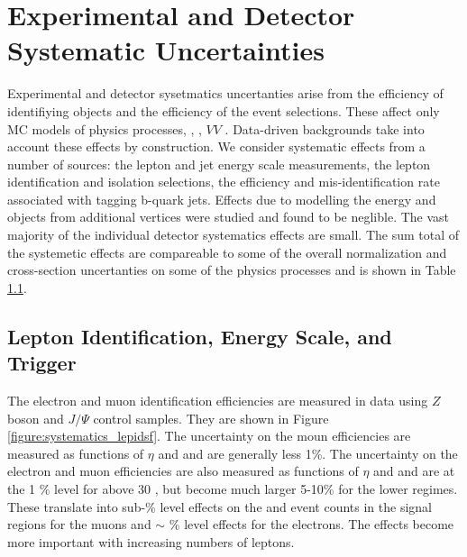 \section{Experimental and Detector Systematic Uncertainties}

Experimental and detector sysetmatics uncertanties arise from the efficiency of identifiying objects and the efficiency of the event selections. These affect only MC models of physics processes, \ttV, \tth, $VV$ . Data-driven backgrounds take into account these effects by construction. We consider systematic effects from a number of sources: the lepton and jet energy scale measurements, the lepton identification and isolation selections, the efficiency and mis-identification rate associated with tagging b-quark jets. Effects due to modelling the energy and objects from additional vertices were studied and found to be neglible. The vast majority of the individual detector systematics effects are small. The sum total of the systemetic effects are compareable to some of the overall normalization and cross-section uncertanties on some of the physics processes and is shown in Table \ref{}.

\subsection{Lepton Identification, Energy Scale, and Trigger}
The electron\cite{ATLAS-CONF-2014-032} and muon identification efficiencies\cite{MuonSF} are measured in data using $Z$ boson and $J/\Psi$ control samples. They are shown in Figure \ref{figure:systematics_lepidsf}. The uncertainty on the moun efficiencies are measured as functions of $\eta$ and \pt and are generally less 1\%. The uncertainty on the electron and muon efficiencies are also measured as functions of $\eta$ and \pt and are at the 1 \% level for \pt above 30 \gevc, but become much larger 5-10\% for the lower \pt regimes.   These translate into sub-\% level effects on the \ttV and \tth event counts in the signal regions for the muons and $\sim$ \% level effects for the electrons. The effects become more important with increasing numbers of leptons.  

